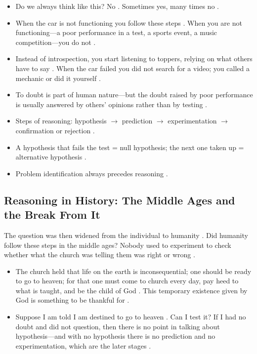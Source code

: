 \begin{CriticalPoint}
\begin{itemize}
    \item Do we always think like this? No . Sometimes yes, many times no .
    \item When the car is not functioning you follow these steps . When you are not functioning---a poor performance in a test, a sports event, a music competition---you do not .
    \item Instead of introspection, you start listening to toppers, relying on what others have to say . When the car failed you did not search for a video; you called a mechanic or did it yourself .
    \item To doubt is part of human nature---but the doubt raised by poor performance is usually answered by others' opinions rather than by testing .
\end{itemize}
\end{CriticalPoint}

\begin{QuickRevision}
\begin{itemize}
    \item Steps of reasoning: hypothesis $\rightarrow$ prediction $\rightarrow$ experimentation $\rightarrow$ confirmation or rejection .
    \item A hypothesis that fails the test = null hypothesis; the next one taken up = alternative hypothesis .
    \item Problem identification always precedes reasoning .
\end{itemize}
\end{QuickRevision}

\subsection{Reasoning in History: The Middle Ages and the Break From It}
The question was then widened from the individual to humanity . Did humanity follow these steps in the middle ages? Nobody used to experiment to check whether what the church was telling them was right or wrong .
\begin{itemize}
    \item The church held that life on the earth is inconsequential; one should be ready to go to heaven; for that one must come to church every day, pay heed to what is taught, and be the child of God . This temporary existence given by God is something to be thankful for .
    \item Suppose I am told I am destined to go to heaven . Can I test it? If I had no doubt and did not question, then there is no point in talking about hypothesis---and with no hypothesis there is no prediction and no experimentation, which are the later stages .
\end{itemize}

